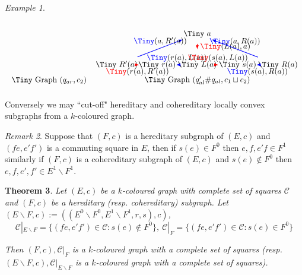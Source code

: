 \documentclass[12pt]{amsart}
\newtheorem{thm}{Theorem}[section]
\theoremstyle{definition}
\theoremstyle{remark}
\newtheorem{rmk}[thm]{Remark}
\newtheorem{example}[thm]{Example}
\numberwithin{equation}{section}
\newcommand{\Cc}{\mathcal{C}}
\begin{document}
\begin{example}
\begin{equation}
\begin{array}{c}
\begin{tikzpicture}[->=stealth,xscale=0.68,yscale=0.78]
\begin{scope}[scale=0.88,xshift=-9.48cm]
\node at (3,-1) {\Tiny Graph $(q_{ar},c_2)$};
\end{scope}

\begin{scope}[xshift=4cm,scale=0.88]

\node[inner sep=1pt,circle] (p0) at (-3,0) {\Tiny $r(a)$};
\node[inner sep=1pt,circle] (p1) at (3,0) {\Tiny $s(a)$};
\node[inner sep=1pt,circle] (f0) at (0,0) {\Tiny $L(a)$};
\node[inner sep=1pt,circle] (lf1) at (-6,0) {\Tiny $R'(a)$};
\node[inner sep=1pt,circle] (rf1) at (6,0) {\Tiny $R(a)$};
\node[inner sep=1pt,circle] (a0) at (0,2) {\Tiny $a$};

\draw[thick,-latex,blue] (p0) -- (f0) node[pos=0.5,above] {\Tiny\color{black}$(r(a),L(a))$};
\draw[thick,-latex,red,dashed] (p0) -- (lf1) node[pos=0.3,below] {\Tiny\color{black}$(r(a),R'(a))$};
\draw[thick,-latex,red,dashed] (p1) -- (f0) node[pos=0.5,above] {\Tiny\color{black}$(s(a),L(a))$};
\draw[thick,-latex,blue] (p1) -- (rf1) node[pos=0.3,below] {\Tiny\color{black}$(s(a),R(a))$};
\draw[thick,-latex,blue] (lf1) -- (a0) node[pos=0.5,above] {\Tiny\color{black}$(a,R'(a))$};
\draw[thick,-latex,dashed,red] (f0) -- (a0) node[pos=0.5,right] {\Tiny\color{black}$(L(a),a)$};
\draw[thick,-latex,blue] (rf1) -- (a0) node[pos=0.5,above] {\Tiny\color{black}$(a,R(a))$};

\node at (0,-1) {\Tiny Graph $(q'_{al} \# q_{al},c_1 \sqcup c_2)$};

\end{scope}

\end{tikzpicture}
\end{array}
\end{equation}
\end{example}



\noindent
Conversely we may ``cut-off" hereditary and cohereditary locally convex subgraphs from a $k$-coloured graph. 

\begin{rmk}
Suppose that  $(F,c)$ is a hereditary subgraph of $(E,c)$ and $(fe,e'f')$ is a commuting square in $E$, then if $s(e) \in F^0$ then $e,f,e'f \in F^1$ similarly if $(F,c)$ is a cohereditary subgraph of $(E,c)$ and $s(e) \not\in F^0$ then $e,f,e',f' \in E^1 \backslash F^1$.
\end{rmk}

\begin{thm}
Let $(E,c)$ be a $k$-coloured graph with complete set of squares $\Cc$ and $(F,c)$ be a hereditary (resp. cohereditary) subgraph. Let $(E\backslash F ,c) := ( ( E^0 \backslash F^0 , E^1 \backslash F^1 ,r,s) , c)$,
\[
 \Cc |_{E\backslash F} = \{ (fe,e'f') \in \Cc : s(e) \notin F^0 \}  , \ \Cc |_{F}
= \{ (fe,e'f') \in \Cc : s(e) \in F^0 \}
\]

\noindent
Then $(F, c) , \Cc |_{F}$ is a $k$-coloured graph with a complete set of squares (resp. $(E \backslash F, c), \Cc |_{E \backslash F}$ is a $k$-coloured graph with a complete set of squares).
\end{thm}
\end{document}

